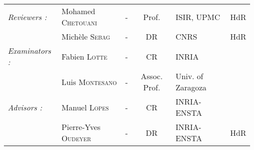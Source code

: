 \begin{titlepage}
\begin{center}
\begin{tabular}{llcclr}
      \textit{Reviewers :}	    & Mohamed \textsc{Chetouani}   & - & Prof.         & ISIR, UPMC          & HdR \\
				                & Mich\`ele \textsc{Sebag}     & - & DR            & CNRS                & HdR \\
      \textit{Examinators :}    & Fabien \textsc{Lotte}        & - & CR            & INRIA                     \\
      				            & Luis \textsc{Montesano}      & - & Assoc. Prof.  & Univ. of Zaragoza         \\
      \textit{Advisors :}       & Manuel \textsc{Lopes}        & - & CR            & INRIA-ENSTA               \\
                                & Pierre-Yves \textsc{Oudeyer} & - & DR            & INRIA-ENSTA         & HdR \\
\end{tabular}
\end{center}
\end{titlepage}
\sloppy

\titlepage
